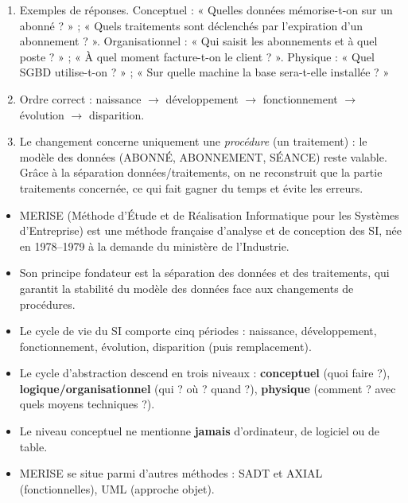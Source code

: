 \documentclass[11pt]{article}
\newcommand{\cle}[1]{{\popxbold\color{popdark}#1}}
\begin{document}
\begin{corrige}[Exercice]
\begin{enumerate}
\item Exemples de réponses. Conceptuel : « Quelles données mémorise-t-on sur un abonné ? » ; « Quels traitements sont déclenchés par l'expiration d'un abonnement ? ». Organisationnel : « Qui saisit les abonnements et à quel poste ? » ; « À quel moment facture-t-on le client ? ». Physique : « Quel SGBD utilise-t-on ? » ; « Sur quelle machine la base sera-t-elle installée ? »
\item Ordre correct : naissance $\rightarrow$ développement $\rightarrow$ fonctionnement $\rightarrow$ évolution $\rightarrow$ disparition.
\item Le changement concerne uniquement une \emph{procédure} (un traitement) : le modèle des données (ABONNÉ, ABONNEMENT, SÉANCE) reste valable. Grâce à la séparation données/traitements, on ne reconstruit que la partie traitements concernée, ce qui fait gagner du temps et évite les erreurs.
\end{enumerate}
\end{corrige}

\begin{aretenir}
\begin{itemize}
\item \cle{MERISE} (Méthode d'Étude et de Réalisation Informatique pour les Systèmes d'Entreprise) est une méthode française d'analyse et de conception des SI, née en 1978--1979 à la demande du ministère de l'Industrie.
\item Son principe fondateur est la \cle{séparation des données et des traitements}, qui garantit la stabilité du modèle des données face aux changements de procédures.
\item Le \cle{cycle de vie} du SI comporte cinq périodes : naissance, développement, fonctionnement, évolution, disparition (puis remplacement).
\item Le \cle{cycle d'abstraction} descend en trois niveaux : \textbf{conceptuel} (quoi faire ?), \textbf{logique/organisationnel} (qui ? où ? quand ?), \textbf{physique} (comment ? avec quels moyens techniques ?).
\item Le niveau conceptuel ne mentionne \textbf{jamais} d'ordinateur, de logiciel ou de table.
\item MERISE se situe parmi d'autres méthodes : SADT et AXIAL (fonctionnelles), UML (approche objet).
\end{itemize}
\end{aretenir}
\end{document}
